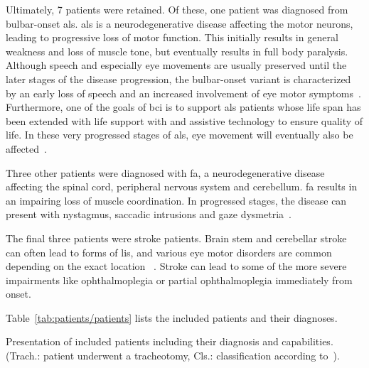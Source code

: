 Ultimately, 7 patients were retained.
Of these, one patient was diagnosed from bulbar-onset \ac{als}.
\ac{als} is a neurodegenerative disease affecting the motor neurons, leading to
progressive loss of motor function.
This initially results in general weakness and loss of muscle tone, but
eventually results in full body paralysis.
Although speech and especially eye movements are usually preserved until the
later stages of the disease progression, the bulbar-onset variant is
characterized by an early loss of speech and an increased involvement of eye
motor symptoms~\cite{Guo2022}.
Furthermore, one of the goals of \ac{bci} is to support \ac{als} patients whose
life span has been extended with life support with and assistive technology to
ensure quality of life.
In these very progressed stages of \ac{als}, eye movement will eventually also
be affected~\cite{Hayashi1991}.

Three other patients were diagnosed with \ac{fa}, a neurodegenerative
disease affecting the
spinal cord, peripheral nervous system and cerebellum.
\ac{fa} results in an impairing loss of muscle coordination.
In progressed stages, the disease can present with nystagmus, saccadic
intrusions and gaze dysmetria~\cite{Cook2017}.

The final three patients were stroke patients.
Brain stem and cerebellar stroke can often lead to forms of \ac{lis}, and
various eye motor disorders are common depending on the exact location
~\cite{Bogousslavsky1987, Moncayo2009}.
Stroke can lead to some of the more severe impairments like ophthalmoplegia or
partial ophthalmoplegia immediately from onset.

Table~\ref{tab:patients/patients} lists the included patients and their
diagnoses.


\begin{table}[t]
  \centering
  \footnotesize
  
  \caption{Presentation of included patients including their diagnosis and
  capabilities. (Trach.: patient underwent a tracheotomy, Cls.: classification according to~\textcite{Wolpaw2006}).
  }
  \label{tab:patients/patients}
\end{table}

